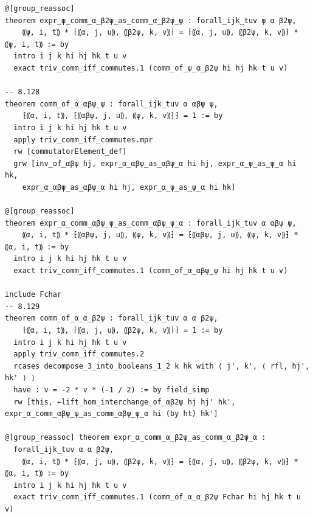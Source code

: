\documentclass[10pt,a4paper]{article}
\begin{document}
\begin{Verbatim}
@[group_reassoc]
theorem expr_ψ_comm_α_β2ψ_as_comm_α_β2ψ_ψ : forall_ijk_tuv ψ α β2ψ,
    ⸨ψ, i, t⸩ * ⁅⸨α, j, u⸩, ⸨β2ψ, k, v⸩⁆ = ⁅⸨α, j, u⸩, ⸨β2ψ, k, v⸩⁆ * ⸨ψ, i, t⸩ := by
  intro i j k hi hj hk t u v
  exact triv_comm_iff_commutes.1 (comm_of_ψ_α_β2ψ hi hj hk t u v)

-- 8.128
theorem comm_of_α_αβψ_ψ : forall_ijk_tuv α αβψ ψ,
    ⁅⸨α, i, t⸩, ⁅⸨αβψ, j, u⸩, ⸨ψ, k, v⸩⁆⁆ = 1 := by
  intro i j k hi hj hk t u v
  apply triv_comm_iff_commutes.mpr
  rw [commutatorElement_def]
  grw [inv_of_αβψ hj, expr_α_αβψ_as_αβψ_α hi hj, expr_α_ψ_as_ψ_α hi hk,
    expr_α_αβψ_as_αβψ_α hi hj, expr_α_ψ_as_ψ_α hi hk]

@[group_reassoc]
theorem expr_α_comm_αβψ_ψ_as_comm_αβψ_ψ_α : forall_ijk_tuv α αβψ ψ,
    ⸨α, i, t⸩ * ⁅⸨αβψ, j, u⸩, ⸨ψ, k, v⸩⁆ = ⁅⸨αβψ, j, u⸩, ⸨ψ, k, v⸩⁆ * ⸨α, i, t⸩ := by
  intro i j k hi hj hk t u v
  exact triv_comm_iff_commutes.1 (comm_of_α_αβψ_ψ hi hj hk t u v)

include Fchar
-- 8.129
theorem comm_of_α_α_β2ψ : forall_ijk_tuv α α β2ψ,
    ⁅⸨α, i, t⸩, ⁅⸨α, j, u⸩, ⸨β2ψ, k, v⸩⁆⁆ = 1 := by
  intro i j k hi hj hk t u v
  apply triv_comm_iff_commutes.2
  rcases decompose_3_into_booleans_1_2 k hk with ⟨ j', k', ⟨ rfl, hj', hk' ⟩ ⟩
  have : v = -2 * v * (-1 / 2) := by field_simp
  rw [this, ←lift_hom_interchange_of_αβ2ψ hj hj' hk', expr_α_comm_αβψ_ψ_as_comm_αβψ_ψ_α hi (by ht) hk']

@[group_reassoc] theorem expr_α_comm_α_β2ψ_as_comm_α_β2ψ_α :
  forall_ijk_tuv α α β2ψ,
    ⸨α, i, t⸩ * ⁅⸨α, j, u⸩, ⸨β2ψ, k, v⸩⁆ = ⁅⸨α, j, u⸩, ⸨β2ψ, k, v⸩⁆ * ⸨α, i, t⸩ := by
  intro i j k hi hj hk t u v
  exact triv_comm_iff_commutes.1 (comm_of_α_α_β2ψ Fchar hi hj hk t u v)


\end{Verbatim}
\end{document}
